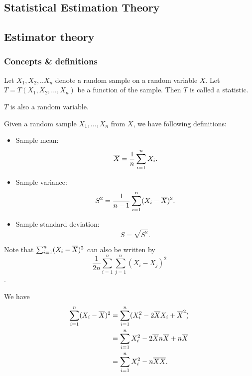\begin{refsection}
	\startcontents[chapters]

\chapter{Statistical Estimation Theory}
\section{Estimator theory}

\subsection{Concepts \& definitions}






\begin{definition}[statistic]
Let $X_1,X_2,..X_n$ denote a random sample on a random variable $X$. Let 
$T=T(X_1,X_2,...,X_n)$ be a function of the sample. Then $T$ is called a statistic.
\end{definition}

\begin{remark}
$T$ is also a random variable.
\end{remark}

\begin{definition}\hfill
Given a random sample $X_1,...,X_n$ from $X$, we have following definitions:
\begin{itemize}
	\item Sample mean:
	$$\overline{X} = \frac{1}{n}\sum_{i=1}^n X_i.$$
	\item Sample variance:
	$$S^2 = \frac{1}{n-1}\sum_{i=1}^n (X_i - \overline{X})^2.$$
	\item Sample standard deviation:
	$$S = \sqrt{S^2}.$$
\end{itemize}
\end{definition}

\begin{remark}
Note that $\sum_{i=1}^n (X_i - \overline{X})^2$ can also be written by $$\frac{1}{2n}\sum_{i=1}^n\sum_{j=1}^n (X_i - X_j)^2$$.

We have
\begin{align*}
\sum_{i=1}^n (X_i - \overline{X})^2 &= \sum_{i=1}^n (X_i^2 - 2\overline{X}X_i + \overline{X}^2) \\
								&= \sum_{i=1}^n X_i^2 - 2\overline{X}n\overline{X} + n\overline{X} \\
								&= \sum_{i=1}^n X_i^2 - n\overline{X}\overline{X}.
\end{align*}



\end{remark}
\end{refsection}
